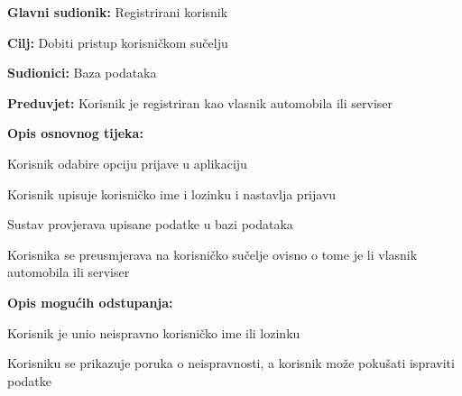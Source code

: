 \noindent {}
\begin{packed_item}

	\item \textbf{Glavni sudionik: } Registrirani korisnik
	\item  \textbf{Cilj:} Dobiti pristup korisničkom sučelju
	\item  \textbf{Sudionici:} Baza podataka
	\item  \textbf{Preduvjet:} Korisnik je registriran kao vlasnik automobila
	ili serviser
	\item  \textbf{Opis osnovnog tijeka:}

	\item[] \begin{packed_enum}

		\item Korisnik odabire opciju prijave u aplikaciju
		\item Korisnik upisuje korisničko ime i lozinku i nastavlja prijavu
		\item Sustav provjerava upisane podatke u bazi podataka
		\item Korisnika se preusmjerava na korisničko sučelje ovisno o tome je li
		vlasnik automobila ili serviser
	\end{packed_enum}

	\item  \textbf{Opis mogućih odstupanja:}

	\item[] \begin{packed_item}

		\item[3.a] Korisnik je unio neispravno korisničko ime ili lozinku
		\item[] \begin{packed_enum}

			\item Korisniku se prikazuje poruka o neispravnosti, a korisnik može
			pokušati ispraviti podatke

		\end{packed_enum}

	\end{packed_item}
\end{packed_item}

